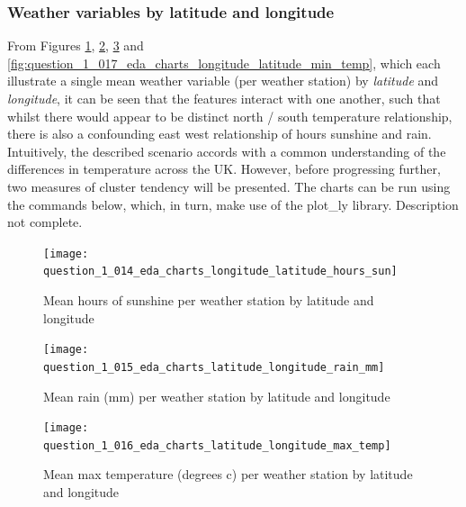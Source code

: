 \documentclass[12pt, oneside, openany]{book}
\begin{document}
\subsubsection*{Weather variables by latitude and longitude}
From Figures \ref{fig:question_1_014_eda_charts_longitude_latitude_hours_sun},  \ref{fig:question_1_015_eda_charts_longitude_latitude_rain_mm}, \ref{fig:question_1_016_eda_charts_latitude_longitude_max_temp} and \ref{fig:question_1_017_eda_charts_longitude_latitude_min_temp}, which each illustrate a single mean weather variable (per weather station) by \emph{latitude} and \emph{longitude}, it can be seen that the features interact with one another, such that whilst there would appear to be distinct north / south temperature relationship, there is also a confounding east west relationship of hours sunshine and rain. Intuitively, the described scenario accords with a common understanding of the differences in temperature across the UK. However, before progressing further, two measures of cluster tendency will be presented. The charts can be run using the commands below, which, in turn, make use of the plot\_ly library. \color{red}Description not complete\color{black}.

\begin{figure}
	\centering
	\captionsetup{justification=centering}
	\texttt{[image: question\_1\_014\_eda\_charts\_longitude\_latitude\_hours\_sun]}
	\caption{Mean hours of sunshine per weather station by latitude and longitude}
	\label{fig:question_1_014_eda_charts_longitude_latitude_hours_sun}
\end{figure}

\begin{figure}
	\centering
	\captionsetup{justification=centering}
	\texttt{[image: question\_1\_015\_eda\_charts\_latitude\_longitude\_rain\_mm]}
	\caption{Mean rain (mm) per weather station by latitude and longitude}
	\label{fig:question_1_015_eda_charts_longitude_latitude_rain_mm}
\end{figure}

\begin{figure}
	\centering
	\captionsetup{justification=centering}
	\texttt{[image: question\_1\_016\_eda\_charts\_latitude\_longitude\_max\_temp]}
	\caption{Mean max temperature (degrees c) per weather station by latitude and longitude}
	\label{fig:question_1_016_eda_charts_latitude_longitude_max_temp}
\end{figure}
\end{document}

